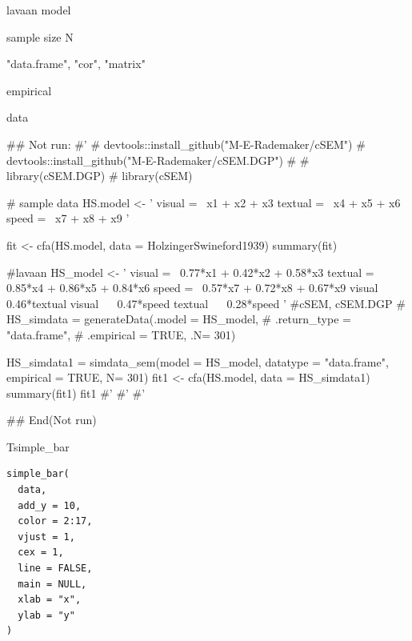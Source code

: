 \documentclass[a4paper]{book}
\begin{document}
%
\begin{Arguments}
\begin{ldescription}
\item[\code{model}] lavaan model

\item[\code{N}] sample size N

\item[\code{datatype}] "data.frame", "cor", "matrix"

\item[\code{empirical}] empirical
\end{ldescription}
\end{Arguments}
%
\begin{Value}
data
\end{Value}
%
\begin{Examples}
\begin{ExampleCode}

\#\# Not run: 
#'
# devtools::install_github("M-E-Rademaker/cSEM")
# devtools::install_github("M-E-Rademaker/cSEM.DGP")
\#
# library(cSEM.DGP)
# library(cSEM)

# sample data
HS.model <- ' visual  =~ x1 + x2 + x3
              textual =~ x4 + x5 + x6
              speed   =~ x7 + x8 + x9
              '

fit <- cfa(HS.model, data = HolzingerSwineford1939)
summary(fit)

#lavaan
HS_model <- ' visual  =~ 0.77*x1 + 0.42*x2 + 0.58*x3
              textual =~ 0.85*x4 + 0.86*x5 + 0.84*x6
              speed   =~ 0.57*x7 + 0.72*x8 + 0.67*x9
              visual ~~  0.46*textual
              visual ~~  0.47*speed
              textual ~~  0.28*speed
          '
#cSEM, cSEM.DGP
# HS_simdata = generateData(.model = HS_model,
#                           .return_type = "data.frame",
#                           .empirical = TRUE, .N= 301)

HS_simdata1 = simdata_sem(model = HS_model,
                          datatype = "data.frame",
                          empirical = TRUE, N= 301)
fit1 <- cfa(HS.model, data = HS_simdata1)
summary(fit1)
fit1 %
#'
#'
#'


## End(Not run)
\end{ExampleCode}
\end{Examples}
%
\begin{Description}
Tsimple\_bar
\end{Description}
%
\begin{Usage}
\begin{verbatim}
simple_bar(
  data,
  add_y = 10,
  color = 2:17,
  vjust = 1,
  cex = 1,
  line = FALSE,
  main = NULL,
  xlab = "x",
  ylab = "y"
)
\end{verbatim}
\end{Usage}
\end{document}
